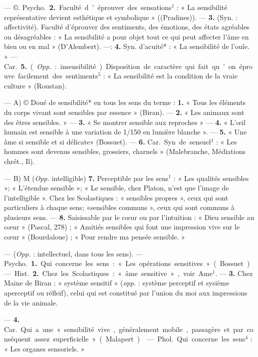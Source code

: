 \begin{itemize}[leftmargin=1cm, label=, itemsep=1pt]
— ©. \si{Psycho.} {\bf 2.} Faculté d’éprouver
des sensations$^1$ : « La sensibilité
représentative devient esthétique et
symbolique » ((Pradines)). — {\bf 3.} (Syn. :
affectivité). Faculté d’éprouver des
sentiments, des émotions, des états
agréables ou désagréables : « La
sensibilité a pour objet tout ce qui
peut affecter l’âme en bien ou en
mal » (D'Alembert). —: {\bf 4.} Syn.
d'acuité* : « La sensibilité de l’ouîe. »
— \si{Car.} {\bf 5.} ({\it Opp.} : insensibilité).
Disposition de caractère qui fait
qu’on éprouve facilement des sentiments$^5$ : « La sensibilité est la condition de la vraie culture » (Roustan).

 — A) © Doué de sensibilité*
en tous les sens du terme : {\bf 1.} « Tous
les éléments du corps vivant sont
sensibles par essence » (Biran). —
 {\bf 2.} « Les animaux sont des êtres sensibles. » — {\bf 3.} « Se montrer sensible
aux reproches » — {\bf 4.} « L’œil
humain est sensible à une variation
de 1/150 en lumière blanche ». —
 {\bf 5.} « Une âme si sensible et si délicate»
(Bossuet). — {\bf 6.} \si{Car.} Syn. de sensuel$^1$ : « Les hommes sont devenus
sensibles, grossiers, charnels » (Malebranche, Médiations chrét., Il).

— B) M ({\it Opp.} intelligible)
 {\bf 7.} Perceptible par les sens$^1$ : « Les
qualités sensibles »; « L’étendue sensible »; « Le sensible, chez Platon,
n’est que l’image de l'intelligible ».
Chez les Scolastiques : « sensibles
propres », ceux qui sont particuliers
à chaque sens; «sensibles communs »,
ceux qui sont communs à plusieurs
sens. — {\bf 8.} Saisissable par le cœur
ou par l'intuition : « Dieu sensible
au cœur » (Pascal, 278) ; « Amitiés
sensibles qui font une impression
vive sur le cœur » (Bourdaloue) ;
« Pour rendre ma pensée sensible. »

 — ({\it Opp.} : intellectuel, dans
tous les sens). — \si{Psycho.} {\bf 1.} Qui
concerne les sens : « Les opérations
sensitives » (Bossuet). — \si{Hist.} {\bf 2.}
Chez les Scolastiques : « âme sensitive », voir Ame$^1$. — {\bf 3.} Chez Maine de
Biran : « système sensitif » ({\it opp.} :
système perceptif et sysième aperceptif ou réfleif), celui qui est
constitué par l’union du moi aux
impressions de la vie animale.

— {\bf 4.} \si{Car.} Qui a une « sensibilité
vive, généralement mobile, passagère et par conséquent assez superficielle » (Malapert).

 — \si{Phol.} Qui concerne les
sens$^4$ : « Les organes sensoriels. »


\end{itemize}
